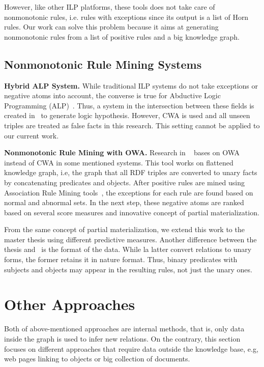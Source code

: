 However, like other ILP platforms, these tools does not take care of nonmonotonic rules, i.e. rules with exceptions since its output is a list of Horn rules. Our work can solve this problem because it aims at generating nonmonotonic rules from a list of positive rules and a big knowledge graph.

\subsection{Nonmonotonic Rule Mining Systems}
\label{related-work-nonmonotonic-rule-mining-systems}

\textbf{Hybrid ALP System.} While traditional ILP systems do not take exceptions or negative atoms into account, the converse is true for Abductive Logic Programming (ALP)~\cite{ref11}. Thus, a system in the intersection between these fields is created in~\cite{ref11} to generate logic hypothesis. However, CWA is used and all unseen triples are treated as false facts in this research. This setting cannot be applied to our current work.

\textbf{Nonmonotonic Rule Mining with OWA.} Research in ~\cite{ref12} bases on OWA instead of CWA in some mentioned systems. This tool works on flattened knowledge graph, i.e, the graph that all RDF triples are converted to unary facts by concatenating predicates and objects. After positive rules are mined using Association Rule Mining tools~\cite{ref13}, the exceptions for each rule are found based on normal and abnormal sets. In the next step, these negative atoms are ranked based on several score measures and innovative concept of partial materialization.

From the same concept of partial materialization, we extend this work to the master thesis using different predictive measures. Another difference between the thesis and~\cite{ref12} is the format of the data. While la latter convert relations to unary forms, the former retains it in nature format. Thus, binary predicates with subjects and objects may appear in the resulting rules, not just the unary ones.

\section{Other Approaches}

Both of above-mentioned approaches are internal methods, that is, only data inside the graph is used to infer new relations. On the contrary, this section focuses on different approaches that require data outside the knowledge base, e.g, web pages linking to objects or big collection of documents.

